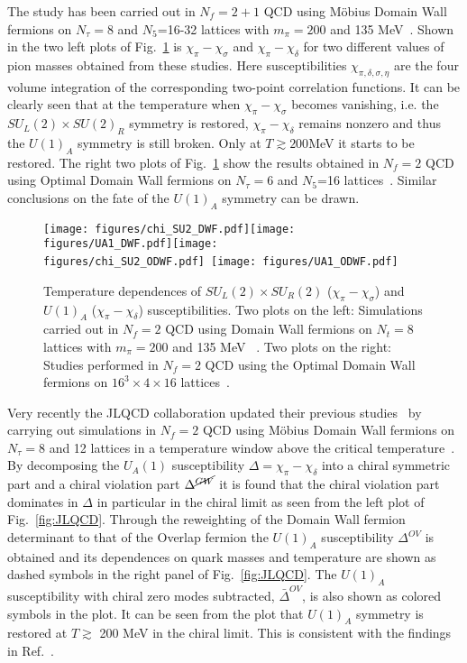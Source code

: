 \documentclass{PoS}
\begin{document}
The study has been carried out in $N_f=2+1$ QCD using M\"obius Domain Wall fermions on $N_\tau=8$ and $N_5$=16-32 lattices with $m_\pi=200$ and 135 MeV~\cite{Bazavov:2012qja,Buchoff:2013nra,Bhattacharya:2014ara}.
Shown in the two left plots of Fig.~\ref{fig:chi_UA1} is $\chi_\pi-\chi_\sigma$ and $\chi_\pi-\chi_\delta$ for two different values of pion masses obtained from these studies.
Here susceptibilities $\chi_{\pi,\delta,\sigma,\eta}$ are the four volume integration of the corresponding two-point correlation functions. It can be clearly seen that at the temperature
when $\chi_\pi-\chi_\sigma$ becomes vanishing, i.e. the $SU_L(2)\times SU(2)_R$ symmetry is restored, $\chi_\pi-\chi_\delta$ remains nonzero and thus the $U(1)_A$ symmetry is still broken. Only at $T\gtrsim 200 $MeV  it starts
to be restored. The right two plots of Fig.~\ref{fig:chi_UA1} show the results obtained in $N_f=2$ QCD using Optimal Domain Wall fermions on $N_\tau=6$ and $N_5$=16 lattices~\cite{Chiu:2013wwa}. Similar conclusions on the fate of the $U(1)_A$ symmetry can be drawn.


\begin{figure}[htp]
\begin{center}
\texttt{[image: figures/chi\_SU2\_DWF.pdf]}\texttt{[image: figures/UA1\_DWF.pdf]}\texttt{[image: figures/chi\_SU2\_ODWF.pdf]}~\texttt{[image: figures/UA1\_ODWF.pdf]}
\end{center}
\caption{Temperature dependences of  $SU_L(2)\times SU_R(2)$ ($\chi_\pi-\chi_\sigma$)  and $U(1)_A$ ($\chi_\pi-\chi_\delta$) susceptibilities. Two plots on the left: Simulations carried out in $N_f=2$ QCD using Domain Wall fermions on $N_t=8$ lattices with $m_\pi=200$ and 135 MeV
~\cite{Bazavov:2012qja,Buchoff:2013nra,Bhattacharya:2014ara}. 
Two plots on the right: Studies performed in $N_f=2$ QCD using the Optimal Domain Wall fermions on $16^3\times 4\times16$ lattices~\cite{Chiu:2013wwa}.}
\label{fig:chi_UA1}
\end{figure}

Very recently the JLQCD collaboration updated their previous studies~\cite{Cossu:2013uua} by carrying out simulations in $N_f=2$ QCD using M\"obius Domain Wall fermions on $N_\tau=8$ and 12 lattices in a temperature window above the critical temperature~\cite{Tomiya:2016jwr}.
By decomposing the $U_A(1)$ susceptibility $\Delta=\chi_\pi-\chi_\delta$ into a chiral symmetric part and a chiral violation part $\Delta^{\cancel{GW}}$ it is found that the chiral violation part dominates in $\Delta$ in particular in the chiral limit as seen from the 
left plot of Fig.~\ref{fig:JLQCD}. Through the reweighting of the Domain Wall fermion determinant to that of the Overlap fermion the $U(1)_A$ susceptibility $\Delta^{OV}$ is obtained and its dependences on quark masses and temperature
are shown as dashed symbols in the right panel of Fig.~\ref{fig:JLQCD}. The  $U(1)_A$ susceptibility with chiral zero modes subtracted, $\bar{\Delta}^{OV}$, is also shown as colored symbols in the plot. It can be seen from the plot that $U(1)_A$ symmetry is 
restored at $T\gtrsim $ 200 MeV in the chiral limit. This is consistent with the findings in Ref.~\cite{Bazavov:2012qja,Buchoff:2013nra,Bhattacharya:2014ara,Chiu:2013wwa}. 
\end{document}
